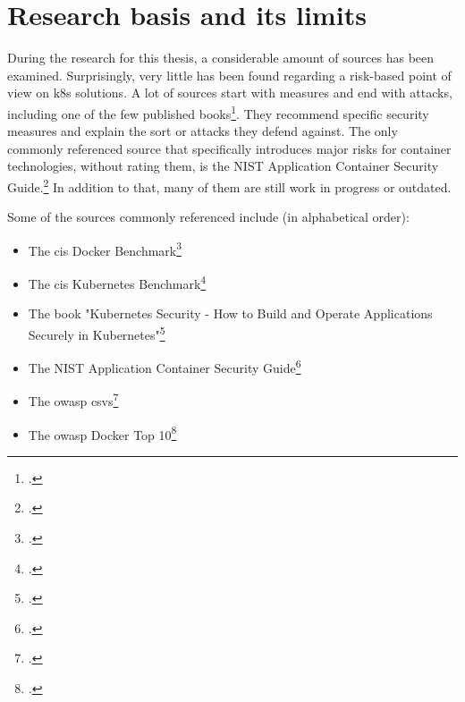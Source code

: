 \section{Research basis and its limits} \label{researchLimits}

During the research for this thesis, a considerable amount of sources has been examined. Surprisingly, very little has been found regarding a risk-based point of view on \gls{k8s} solutions. A lot of sources start with measures and end with attacks, including one of the few published books\footcite{k8sBook}. They recommend specific security measures and explain the sort or attacks they defend against. The only commonly referenced source that specifically introduces major risks for container technologies, without rating them, is the NIST Application Container Security Guide.\footcite{nistK8s}
In addition to that, many of them are still work in progress or outdated.

Some of the sources commonly referenced include (in alphabetical order):
\begin{itemize}

\item The \gls{cis} Docker Benchmark\footcite{cisDocker}

\item The \gls{cis} Kubernetes Benchmark\footcite{cisK8s}

\item The book "Kubernetes Security - How to Build and Operate Applications Securely in Kubernetes"\footcite{k8sBook}

\item The NIST Application Container Security Guide\footcite{nistK8s}

\item The \gls{owasp} \gls{csvs}\footcite{csvsGithub}

\item The \gls{owasp} Docker Top 10\footcite{dockerTop10Github}

\end{itemize}

